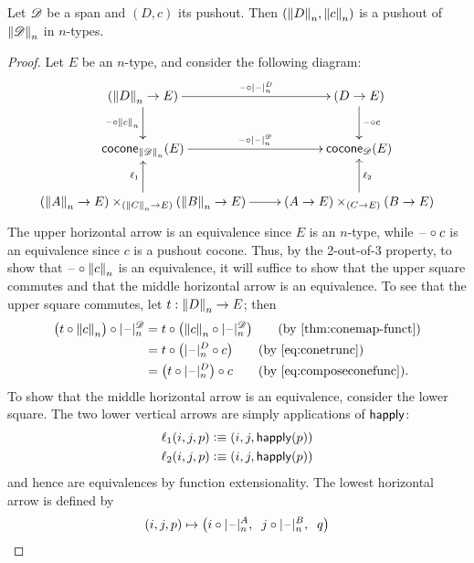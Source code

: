 \begin{thm}
  \label{reflectcommutespushout}
  Let $\Ddiag$ be a span and $(D,c)$ its pushout.
  Then $(\trunc nD,\trunc n c)$ is a pushout of $\trunc n\Ddiag$ in $n$-types.
\end{thm}
\begin{proof}
  Let $E$ be an $n$-type, and consider the following diagram:
\bgroup
\def\reflect(#1){\trunc n{#1}}
  \begin{equation*}
  \vcenter{\xymatrix{
      (\trunc nD \to E)\ar[r]^-{\blank\circ \tprojf[D] n}\ar[d]_{\blank\circ \trunc nc} &
      (D\to E)\ar[d]^{\blank\circ c}\\
      \cocone{\trunc n \Ddiag}{E}\ar[r]^-{\blank\circ \tprojf[\Ddiag]n}\ar@{<-}[d]_{\ell_1} &
      \cocone{\Ddiag}{E}\ar@{<-}[d]^{\ell_2}\\
      (\reflect(A)\to{}E)\times_{(\reflect(C)\to{}E)}(\reflect(B)\to{}E)\ar[r] &
      (A\to{}E)\times_{(C\to{}E)}(B\to{}E)
      }}
  \end{equation*}
\egroup
  The upper horizontal arrow is an equivalence since $E$ is an $n$-type, while $\blank\circ c$ is an equivalence since $c$ is a pushout cocone.
  Thus, by the 2-out-of-3 property, to show that $\blank\circ \trunc nc$ is an equivalence, it will suffice to show that the upper square commutes and that the middle horizontal arrow is an equivalence.
  To see that the upper square commutes, let $t:\trunc nD \to E$; then
  \begin{align}
    \big(t \circ \trunc n c\big) \circ \tprojf[\Ddiag] n
    &= t \circ \big(\trunc n c \circ \tprojf[\Ddiag] n\big)
    \tag{by \cref{thm:conemap-funct}}\\
    &= t\circ \big(\tprojf[D]n \circ c\big)
    \tag{by~\eqref{eq:conetrunc}}\\
    &= \big(t\circ \tprojf[D]n\big) \circ c
    \tag{by~\eqref{eq:composeconefunc}}.
  \end{align}
  To show that the middle horizontal arrow is an equivalence, consider the lower square.
  The two lower vertical arrows are simply applications of $\happly$:
  \begin{align*}
    \ell_1(i,j,p) &\defeq (i,j,\happly(p))\\
    \ell_2(i,j,p) &\defeq (i,j,\happly(p))
  \end{align*}
  and hence are equivalences by function extensionality.
  The lowest horizontal arrow is defined by
  \[ (i,j,p) \mapsto \big( i\circ \tprojf[A]n,\;\; j \circ \tprojf[B] n,\;\; q\big) \]

\end{proof}
